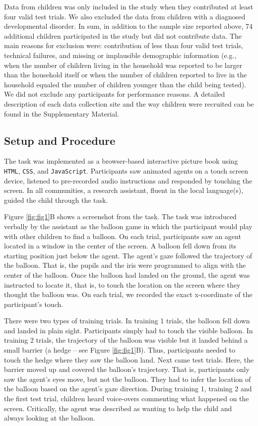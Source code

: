 \documentclass[
  man,floatsintext]{apa7}
\begin{document}
Data from children was only included in the study when they contributed at least four valid test trials. We also excluded the data from children with a diagnosed developmental disorder. In sum, in addition to the sample size reported above, 74 additional children participated in the study but did not contribute data. The main reasons for exclusion were: contribution of less than four valid test trials, technical failures, and missing or implausible demographic information (e.g., when the number of children living in the household was reported to be larger than the household itself or when the number of children reported to live in the household equaled the number of children younger than the child being tested). We did not exclude any participants for performance reasons. A detailed description of each data collection site and the way children were recruited can be found in the Supplementary Material.

\subsection{Setup and Procedure}\label{setup-and-procedure}

The task was implemented as a browser-based interactive picture book using \texttt{HTML}, \texttt{CSS}, and \texttt{JavaScript}. Participants saw animated agents on a touch screen device, listened to pre-recorded audio instructions and responded by touching the screen. In all communities, a research assistant, fluent in the local language(s), guided the child through the task.

Figure \ref{fig:fig1}B shows a screenshot from the task. The task was introduced verbally by the assistant as the balloon game in which the participant would play with other children to find a balloon. On each trial, participants saw an agent located in a window in the center of the screen. A balloon fell down from its starting position just below the agent. The agent's gaze followed the trajectory of the balloon. That is, the pupils and the iris were programmed to align with the center of the balloon. Once the balloon had landed on the ground, the agent was instructed to locate it, that is, to touch the location on the screen where they thought the balloon was. On each trial, we recorded the exact x-coordinate of the participant's touch.

There were two types of training trials. In training 1 trials, the balloon fell down and landed in plain sight. Participants simply had to touch the visible balloon. In training 2 trials, the trajectory of the balloon was visible but it landed behind a small barrier (a hedge -- see Figure \ref{fig:fig1}B). Thus, participants needed to touch the hedge where they saw the balloon land. Next came test trials. Here, the barrier moved up and covered the balloon's trajectory. That is, participants only saw the agent's eyes move, but not the balloon. They had to infer the location of the balloon based on the agent's gaze direction. During training 1, training 2 and the first test trial, children heard voice-overs commenting what happened on the screen. Critically, the agent was described as wanting to help the child and always looking at the balloon.
\end{document}
